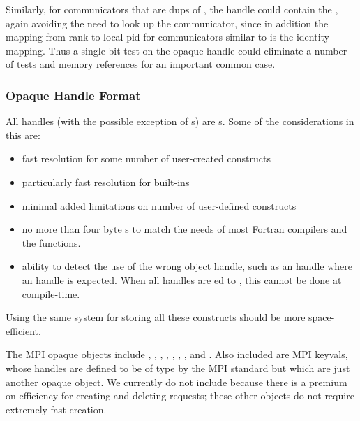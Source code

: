 \documentclass{article}
\begin{document}
Similarly, for
communicators that are dups of , the handle could
contain the , again avoiding the need to look up the
communicator, since in addition the mapping from rank to local pid for 
communicators similar to  is the identity
mapping.  Thus a single bit test on the opaque handle could eliminate
a number of tests and memory references for an important common case.

\subsubsection{Opaque Handle Format}
All handles (with the possible exception of s) are
s.  Some of the considerations in this are:
\begin{itemize}
\item fast resolution for some number of user-created constructs
\item particularly fast resolution for built-ins
\item minimal added limitations on number of user-defined constructs 
\item no more than four byte s to match the needs of most
Fortran compilers and the  functions.
\item ability to detect the use of the wrong object handle, such as an
 handle where an  handle is
expected.  When all handles are ed to , this
cannot be done at compile-time.
\end{itemize}

Using the same system for storing all these constructs should be more
space-efficient.

The MPI opaque objects include , ,
, , ,
, , and .  
Also included are MPI keyvals, whose handles are defined to be of type
 by the MPI standard but which are just another opaque object.
We
currently do not include  because there is a
premium on efficiency for creating and deleting requests; these other
objects do not require extremely fast creation.
\end{document}

